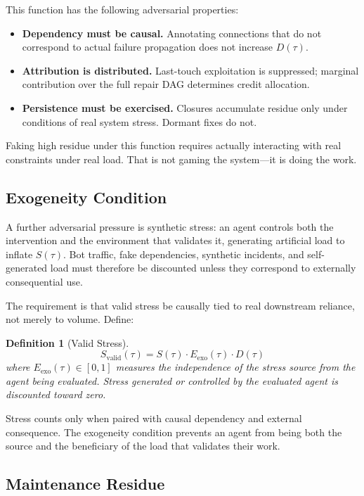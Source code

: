 \documentclass[12pt]{article}
\newtheorem{definition}{Definition}
\begin{document}
This function has the following adversarial properties:
\begin{itemize}
  \item \textbf{Dependency must be causal.} Annotating connections that
    do not correspond to actual failure propagation does not increase
    $D(\tau)$.
  \item \textbf{Attribution is distributed.} Last-touch exploitation is
    suppressed; marginal contribution over the full repair DAG
    determines credit allocation.
  \item \textbf{Persistence must be exercised.} Closures accumulate
    residue only under conditions of real system stress. Dormant fixes
    do not.
\end{itemize}

Faking high residue under this function requires actually interacting
with real constraints under real load. That is not gaming the
system---it is doing the work.

\subsection{Exogeneity Condition}

A further adversarial pressure is synthetic stress: an agent controls
both the intervention and the environment that validates it, generating
artificial load to inflate $S(\tau)$. Bot traffic, fake dependencies,
synthetic incidents, and self-generated load must therefore be
discounted unless they correspond to externally consequential use.

The requirement is that valid stress be causally tied to real downstream
reliance, not merely to volume. Define:

\begin{definition}[Valid Stress]
\[
  S_{\mathrm{valid}}(\tau) = S(\tau) \cdot E_{\mathrm{exo}}(\tau) \cdot D(\tau)
\]
where $E_{\mathrm{exo}}(\tau) \in [0,1]$ measures the independence of
the stress source from the agent being evaluated. Stress generated or
controlled by the evaluated agent is discounted toward zero.
\end{definition}

Stress counts only when paired with causal dependency and external
consequence. The exogeneity condition prevents an agent from being both
the source and the beneficiary of the load that validates their work.

\subsection{Maintenance Residue}
\end{document}

